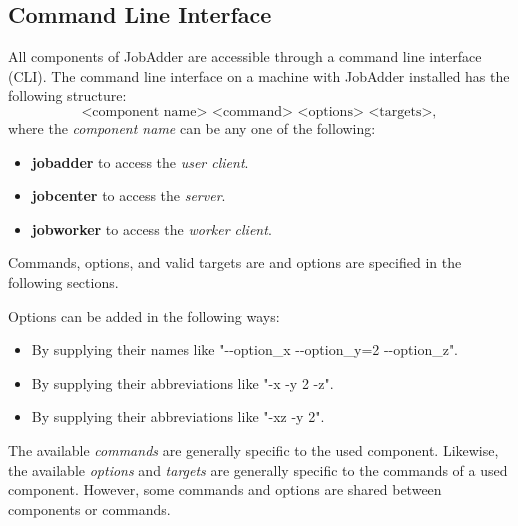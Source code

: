 \newcommand{\jacommand}[3]{
\textsc{\LARGE{\textbf{#1}}}
\begin{itemize}
\item \textbf{Options:} #2
\item \textbf{Effect:} #3
\end{itemize}
}
\newcommand{\jaoptionheader}{\textsc{\textbf{Option descriptions:}}\newline\newline}
\newcommand{\jaoption}[3]{
\textbf{#1}
\begin{itemize}
\item \textbf{Short form:} #2
\item \textbf{Effect:} #3
\end{itemize}
}
\subsection{Command Line Interface}
All components of JobAdder are accessible through a command line interface (CLI).
The command line interface on a machine with JobAdder installed has the following structure:
\begin{equation}
\text{<component name> <command> <options> <targets>},
\end{equation}
where the \textit{component name} can be any one of the following:
\begin{itemize}
\item \textbf{jobadder} to access the \textit{user client}.
\item \textbf{jobcenter} to access the \textit{server}.
\item \textbf{jobworker} to access the \textit{worker client}.
\end{itemize}
Commands, options, and valid targets are and options are specified in the following sections.

Options can be added in the following ways:
\begin{itemize}
\item By supplying their names like "-{}-option\_x -{}-option\_y=2 -{}-option\_z".
\item By supplying their abbreviations like "-x -y 2 -z".
\item By supplying their abbreviations like "-xz -y 2".
\end{itemize}

The available \textit{commands} are generally specific to the used component.
Likewise, the available \textit{options} and \textit{targets} are generally specific to the commands of a used component.
However, some commands and options are shared between components or commands.

